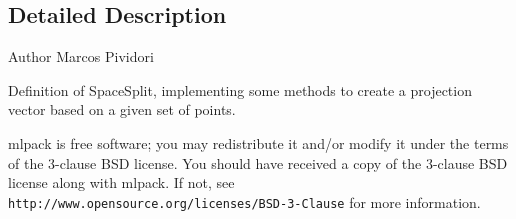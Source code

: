 \subsection{Detailed Description}
\begin{DoxyAuthor}{Author}
Marcos Pividori
\end{DoxyAuthor}
Definition of Space\+Split, implementing some methods to create a projection vector based on a given set of points.

mlpack is free software; you may redistribute it and/or modify it under the terms of the 3-\/clause B\+SD license. You should have received a copy of the 3-\/clause B\+SD license along with mlpack. If not, see {\tt http\+://www.\+opensource.\+org/licenses/\+B\+S\+D-\/3-\/\+Clause} for more information. 